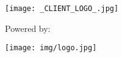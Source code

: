 \texttt{[image: \_CLIENT\_LOGO\_.jpg]}

\vspace{100px}

\centerline{Powered by:}
\texttt{[image: img/logo.jpg]}
\newpage